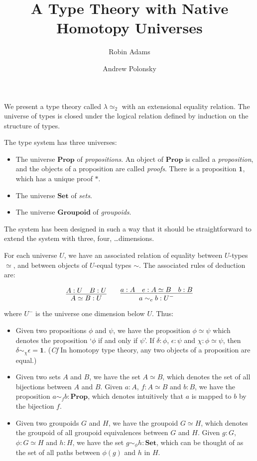 \documentclass{easychair}
\title{A Type Theory with Native Homotopy Universes}
\author{Robin Adams\inst{1} \and Andrew Polonsky\inst{2}}
\institute{Universitetet i Bergen \and University Paris Diderot}
\newcommand{\Prop}{\ensuremath{\mathbf{Prop}}}
\newcommand{\Set}{\ensuremath{\mathbf{Set}}}
\newcommand{\Groupoid}{\ensuremath{\mathbf{Groupoid}}}
\newcommand{\LEtwo}{\ensuremath{\lambda \! \! \simeq_2}}
\begin{document}
\maketitle

We present a type theory called $\LEtwo$ with an extensional equality relation. The universe of types is closed under the logical relation defined by induction on the structure of types.

The type system has three universes:
\begin{itemize}
\item
The universe $\Prop$ of \emph{propositions}.  An object of $\Prop$ is
called a \emph{proposition}, and the objects of a proposition are
called \emph{proofs}.  There is a proposition $\mathbf{1}$, which has
a unique proof $*$.
\item
The universe $\Set$ of \emph{sets}.
\item
The universe $\Groupoid$ of \emph{groupoids}.
\end{itemize}
The system has been designed in such a way that it should be straightforward to extend the system with three, four, \ldots dimensions.

For each universe $U$, we have an associated relation of equality
between $U$-types $\simeq$, and between objects of $U$-equal
types $\sim$.  The associated rules of deduction are:

\[ \infer{A \simeq B : U}{A : U \quad B : U}
\qquad
\infer{a \sim_e b : U^-}{a : A \quad e : A \simeq B \quad b : B} \]

where $U^-$ is the universe one dimension below $U$.  Thus:
\begin{itemize}
\item
Given two propositions $\phi$ and $\psi$, we have the proposition $\phi \simeq \psi$ which denotes the proposition `$\phi$ if and only if $\psi$'.  If $\delta : \phi$, $\epsilon : \psi$ and $\chi : \phi \simeq \psi$, then $\delta \sim_\chi \epsilon = \mathbf{1}$.  (\emph{Cf} In homotopy type theory, any two objects of a proposition are equal.)
\item
Given two sets $A$ and $B$, we have the set $A \simeq B$, which denotes the set of all bijections between $A$ and $B$.  Given $a : A$, $f : A \simeq B$ and $b : B$, we have the proposition $a \sim_f b : \Prop$, which denotes intuitively that $a$ is mapped to $b$ by the bijection $f$.
\item
Given two groupoids $G$ and $H$, we have the groupoid $G \simeq H$,
which denotes the groupoid of all groupoid equivalences between $G$ and $H$.  Given $g : G$, $\phi : G \simeq H$ and $h : H$, we have the set $g \sim_\phi h : \Set$, which can be thought of as the set of all paths between $\phi(g)$ and $h$ in $H$.
\end{itemize}
\end{document}
